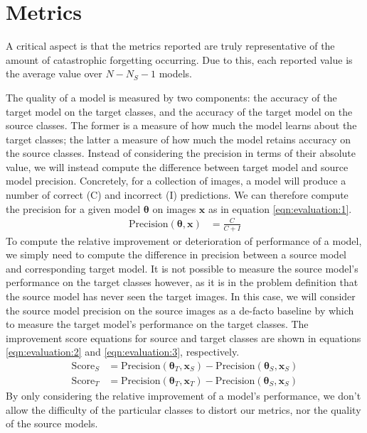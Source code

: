 \documentclass{report}
\begin{document}
	\section{Metrics}
	A critical aspect is that the metrics reported are truly representative of the amount of catastrophic forgetting occurring. Due to this, each reported value is the average value over $N-N_S-1$ models. \par
	The quality of a model is measured by two components: the accuracy of the target model on the target classes, and the accuracy of the target model on the source classes. The former is a measure of how much the model learns about the target classes; the latter a measure of how much the model retains accuracy on the source classes. Instead of considering the precision in terms of their absolute value, we will instead compute the difference between target model and source model precision. Concretely, for a collection of images, a model will produce a number of correct (C) and incorrect (I) predictions. We can therefore compute the precision for a given model $\bm{\theta}$ on images $\bm{x}$ as in equation \ref{eqn:evaluation:1}.
	\begin{align} \label{eqn:evaluation:1}
	\text{Precision}(\bm{\theta}, \bm{x}) &= \frac{C}{C+I}
	\end{align}
	To compute the relative improvement or deterioration of performance of a model, we simply need to compute the difference in precision between a source model and corresponding target model. It is not possible to measure the source model's performance on the target classes however, as it is in the problem definition that the source model has never seen the target images. In this case, we will consider the source model precision on the source images as a de-facto baseline by which to measure the target model's performance on the target classes. The improvement score equations for source and target classes are shown in equations \ref{eqn:evaluation:2} and \ref{eqn:evaluation:3}, respectively.
	\begin{align} \label{eqn:evaluation:2}
	\text{Score}_S &= \text{Precision}(\bm{\theta}_T, \bm{x}_S) - \text{Precision}(\bm{\theta}_S, \bm{x}_S) \\
	\label{eqn:evaluation:3}
	\text{Score}_T &= \text{Precision}(\bm{\theta}_T, \bm{x}_T) - \text{Precision}(\bm{\theta}_S, \bm{x}_S)
	\end{align}
	By only considering the relative improvement of a model's performance, we don't allow the difficulty of the particular classes to distort our metrics, nor the quality of the source models. \par
	
\end{document}
